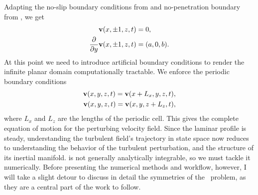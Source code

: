 Adapting the no-slip boundary conditions from  and no-penetration boundary from , we get
\begin{align}
&\Vector{v}(x,\pm 1,z,t) = 0,\\
\pder{1}{}{y}&\Vector{v}(x,\pm 1,z,t) = (a,0,b).
\end{align}
At this point we need to introduce artificial boundary conditions to  render the infinite planar domain computationally tractable. We enforce the periodic boundary conditions 
\begin{align}
\mathbf{v}(x,y,z,t) = \mathbf{v}(x+L_x,y,z,t),\label{eq:periodicBCx}\\
\mathbf{v}(x,y,z,t) = \mathbf{v}(x,y,z+L_z,t),\label{eq:periodicBCz}
\end{align}
where $L_x$ and $L_z$ are the lengths of the periodic cell. This gives the complete equation of motion for the perturbing velocity field.  Since the laminar profile is steady, understanding the turbulent field's trajectory in state space now reduces to understanding the behavior of the turbulent perturbation, and the structure of its inertial manifold.  is not generally analytically integrable, so we must tackle it numerically. Before presenting the numerical methods and workflow, however, I will take a slight detour to discuss in detail the symmetries of the \pCf\ problem, as they are a central part of the work to follow. 
